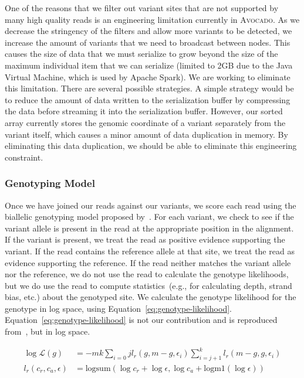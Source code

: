 \documentclass{bioinfo}
\begin{document}
\begin{methods}
One of the reasons that we filter out variant sites that are not supported
by many high quality reads is an engineering limitation currently in
\textsc{Avocado}. As we decrease the stringency of the filters and allow
more variants to be detected, we increase the amount of variants that we
need to broadcast between nodes. This causes the size of data that we
must serialize to grow beyond the size of the maximum individual item
that we can serialize (limited to 2GB due to the Java Virtual Machine, which
is used by Apache Spark).
We are working to eliminate this limitation. There are several possible
strategies. A simple strategy would be to reduce the amount of data written
to the serialization buffer by compressing the data before streaming it
into the serialization buffer. However, our sorted array currently
stores the genomic coordinate of a variant separately from the variant
itself, which causes a minor amount of data duplication in memory. By
eliminating this data duplication, we should be able to eliminate this
engineering constraint.

\subsubsection{Genotyping Model}
\label{sec:genotyping-model}

Once we have joined our reads against our variants, we score each read using
the biallelic genotyping model proposed by~\citet{li11}. For each variant, we
check to see if the variant allele is present in the read at the appropriate
position in the alignment. If the variant is present, we treat the read as positive
evidence supporting the variant. If the read contains the reference allele at
that site, we treat the read as evidence supporting the reference. If the read
neither matches the variant allele nor the reference, we do not use the read
to calculate the genotype likelihoods, but we do use the read to compute
statistics~(e.g., for calculating depth, strand bias, etc.) about the genotyped
site. We calculate the genotype likelihood for the genotype in log space, using
Equation~\eqref{eq:genotype-likelihood}. Equation~\eqref{eq:genotype-likelihood}
is not our contribution and is reproduced from~\citet{li11}, but in log space.

\begin{align}
\label{eq:genotype-likelihood}
\log \mathcal{L}(g) &= -m k \sum_{i = 0}{j} l_r(g, m - g, \epsilon_i) \sum_{i = j + 1}^k l_r(m - g, g, \epsilon_i) \\
l_r(c_r, c_a, \epsilon) &= \text{logsum}(\log c_r + \log \epsilon, \log c_a + \text{logm1}(\log \epsilon))
\end{align}


\end{methods}
\end{document}
